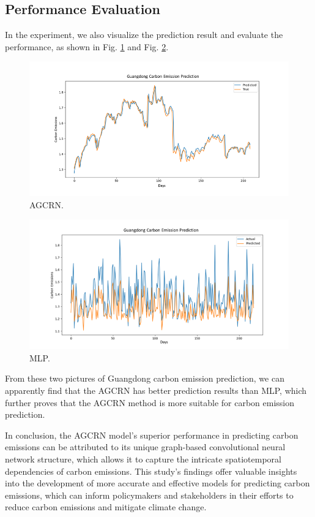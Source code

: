 \documentclass[sigconf, authordraft]{acmart}
\begin{document}
\subsection{Performance Evaluation }
In the experiment, we also visualize the prediction result and evaluate the performance,
as shown in Fig. \ref{fig:AGCRN} and Fig. \ref{fig:MLP}.

\begin{figure}[h]
	\centering
	\includegraphics[width=\columnwidth]{figures/AGCRN.png}
	\caption{AGCRN.}
	\label{fig:AGCRN}
\end{figure}

\begin{figure}[h]
	\centering
	\includegraphics[width=\columnwidth]{figures/MLP.png}
	\caption{MLP.}
	\label{fig:MLP}
\end{figure}

From these two pictures of Guangdong carbon emission prediction, we can apparently
find that the AGCRN has better prediction results than MLP, which further
proves that the AGCRN method is more suitable for carbon emission prediction.

In conclusion, the AGCRN model's superior performance in predicting carbon emissions
can be attributed to its unique graph-based convolutional neural network structure,
which allows it to capture the intricate spatiotemporal dependencies of carbon
emissions. This study's findings offer valuable insights into the development of
more accurate and effective models for predicting carbon emissions, which can
inform policymakers and stakeholders in their efforts to reduce carbon
emissions and mitigate climate change.
\end{document}
